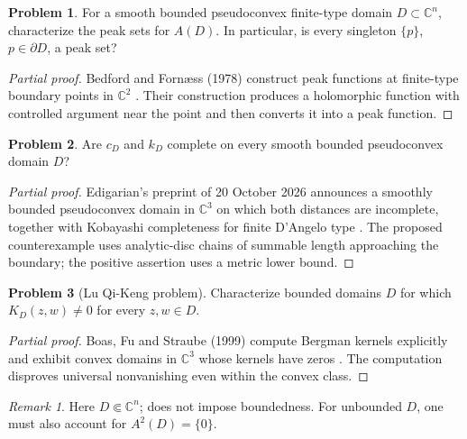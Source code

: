 \documentclass[11pt,reqno]{amsart}
\theoremstyle{definition}
\newtheorem{problem}{Problem}[section]
\theoremstyle{remark}
\newtheorem*{remark}{Remark}
\begin{document}
\begin{problem}\label{b95-5-4-1}\label{b95-5-4-2}
For a smooth bounded pseudoconvex finite-type domain $D\subset\mathbb C^n$, characterize the peak sets for $A(D)$. In particular, is every singleton $\{p\}$, $p\in\partial D$, a peak set?
\end{problem}
\begin{proof}[Partial proof]
Bedford and Forn\ae ss (1978) construct peak functions at finite-type boundary points in $\mathbb C^2$ \cite{B95-BF}. Their construction produces a holomorphic function with controlled argument near the point and then converts it into a peak function.
\end{proof}

\begin{problem}\label{b95-7-3-1}
Are $c_D$ and $k_D$ complete on every smooth bounded pseudoconvex domain $D$?
\end{problem}
\begin{proof}[Partial proof]
Edigarian's preprint of 20 October 2026 announces a smoothly bounded pseudoconvex domain in $\mathbb C^3$ on which both distances are incomplete, together with Kobayashi completeness for finite D'Angelo type \cite[Theorems~1.1--1.2]{B95-Edigarian26}. The proposed counterexample uses analytic-disc chains of summable length approaching the boundary; the positive assertion uses a metric lower bound.
\end{proof}

\begin{problem}[Lu Qi-Keng problem]\label{b95-7-2-2}
Characterize bounded domains $D$ for which $K_D(z,w)\ne0$ for every $z,w\in D$.
\end{problem}
\begin{proof}[Partial proof]
Boas, Fu and Straube (1999) compute Bergman kernels explicitly and exhibit convex domains in $\mathbb C^3$ whose kernels have zeros \cite{B95-BFS}. The computation disproves universal nonvanishing even within the convex class.
\end{proof}
\begin{remark}
Here $D\Subset\mathbb C^n$; \cite[Problem~7.2.2]{B95} does not impose boundedness. For unbounded $D$, one must also account for $A^2(D)=\{0\}$.
\end{remark}
\end{document}
